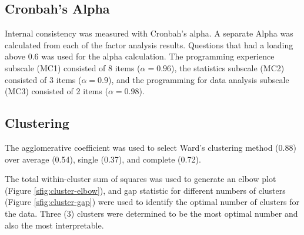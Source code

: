\documentclass[020-persona\_validation.tex]{subfiles}
\begin{document}
    \subsection{Cronbah's Alpha}

        Internal consistency was measured with Cronbah's alpha.
        A separate Alpha was calculated from each of the factor analysis results.
        Questions that had a loading above 0.6 was used for the alpha calculation.
        The programming experience subscale (MC1) consisted of 8 items ($\alpha = 0.96$),
        the statistics subscale (MC2) consisted of 3 items ($\alpha = 0.9$), and
        the programming for data analysis subscale (MC3) consisted of 2 items ($\alpha = 0.98$).

    \subsection{Clustering}

        The agglomerative coefficient was used to select Ward's clustering method (0.88) over
        average (0.54), single (0.37), and complete (0.72).

        The total within-cluster sum of squares was used to generate an elbow plot (Figure \ref{sfig:cluster-elbow}),
        and gap statistic for different numbers of clusters (Figure \ref{sfig:cluster-gap}) were used to identify
        the optimal number of clusters for the data.
        Three (3) clusters were determined to be the most optimal number and also the most interpretable.
\end{document}
